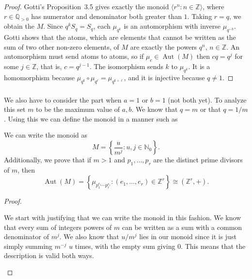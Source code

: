 \documentclass[11pt]{scrartcl}
\begin{document}
\begin{soln}
    \begin{proof}
        Gotti's Proposition~3.5
        \cite[Proposition~3.5]{p6-gotti} gives exactly the monoid
        $\langle r^n:n\in\mathbb Z\rangle$, where $r\in\mathbb Q_{>0}$ has numerator and
        denominator both greater than $1$. Taking $r=q$, we obtain the $M$. Since
        $q^kS_q=S_q$, each $\mu_{q^k}$ is an automorphism with inverse $\mu_{q^{-k}}$.
        Gotti shows that the atoms, which are elements that cannot be 
        written as the sum of two other non-zero elements, of $M$ are exactly the powers $q^n$, $n\in\mathbb Z$.
        An automorphism must send atoms to atoms, so if $\mu_c\in\operatorname{Aut}(M)$
        then $cq=q^j$ for some $j\in\mathbb Z$, that is, $c=q^{j-1}$.
        The isomorphism sends $k$ to $\mu_{q^k}$. It is a homomorphism because
        $\mu_{q^k}\circ\mu_{q^\ell}=\mu_{q^{k+\ell}}$, and it is injective because $q\neq1$.
    \end{proof}

    \subsubsection*{}
	We also have to consider the 
	part when $a=1$ or $b=1$ (not both yet). To analyze this set $m$ to be the 
	maximum value of $a,b$. We know that $q=m$ or that $q=1/m$. Using this 
	we can define the monoid in a manner such as
    \begin{claim*}
        We can write the monoid as 
        \[
        M=\left\{\frac{u}{m^j}:u,j\in\mathbb N_0\right\}.
        \]
			Additionally, we prove that if $m>1$ and
		$p_1,\ldots,p_r$ are the distinct prime divisors of $m$, then
        \[
        \operatorname{Aut}(M)
        =
        \left\{
            \mu_{p_1^{e_1}\cdots p_r^{e_r}}:
            (e_1,\ldots,e_r)\in\mathbb Z^r
        \right\}
        \cong(\mathbb Z^r,+).
        \]
    \end{claim*}

    \begin{proof}
        \begin{subproof}
			We start with justifying that we can write the monoid in this
			fashion. We know that every sum of integers powers of $m$ can be
			written as a sum with a common denominator of $m^j$. We also know that
			$u/m^j$ lies in our monoid since it is just simply summing $m^{-j}$ $u$ times,
			with the empty sum giving $0$. This means that the description is valid both ways.
        \end{subproof}


\end{proof}
\end{soln}
\end{document}

